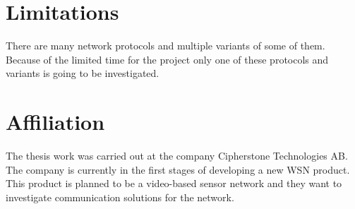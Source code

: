 \section{Limitations}
There are many network protocols and multiple variants of some of them. Because of the limited time for the project only one of these protocols and variants is going to be investigated. 

\section{Affiliation}
The thesis work was carried out at the company Cipherstone Technologies AB. The company is currently in the first stages of developing a new WSN product. This product is planned to be a video-based sensor network and they want to investigate communication solutions for the network.




